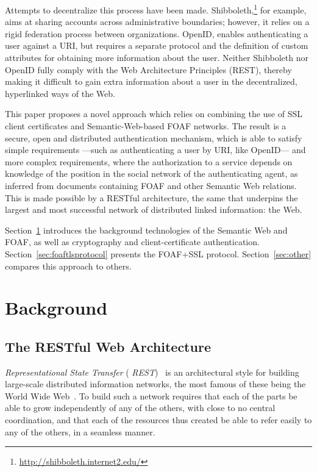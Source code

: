 \documentclass{llncs}
\begin{document}
Attempts to decentralize this process have been
made. Shibboleth,\footnote{\url{http://shibboleth.internet2.edu/}} for
example, aims at sharing accounts across administrative boundaries;
however, it relies on a rigid federation process between
organizations.  OpenID, enables authenticating a user against a URI,
but requires a separate protocol and the definition of custom
attributes for obtaining more information about the user.  Neither
Shibboleth nor OpenID fully comply with the Web Architecture
Principles (REST), thereby making it difficult to gain extra
information about a user in the decentralized, hyperlinked ways of the
Web.

This paper proposes a novel approach which relies on combining the use
of SSL client certificates and Semantic-Web-based FOAF networks. The
result is a secure, open and distributed authentication mechanism,
which is able to satisfy simple requirements ---such as authenticating
a user by URI, like OpenID--- and more complex requirements, where the
authorization to a service depends on knowledge of the position in the
social network of the authenticating agent, as inferred from documents
containing FOAF and other Semantic Web relations. This is made
possible by a RESTful architecture, the same that underpins the
largest and most successful network of distributed linked information:
the Web.

Section~\ref{sec:background} introduces the background technologies of
the Semantic Web and FOAF, as well as cryptography and
client-certificate authentication.  Section~\ref{sec:foaftlsprotocol}
presents the FOAF+SSL protocol.  Section~\ref{sec:other} compares this
approach to others.

\section{Background}
\label{sec:background}

\subsection{The RESTful Web Architecture}
\label{sec:rest}

{\em Representational State Transfer} ({\em
  REST})~\cite[Chap.~5]{fielding2000phd} is an architectural style for
building large-scale distributed information networks, the most famous
of these being the World Wide Web~\cite{WebArchVol1}.  To build such a
network requires that each of the parts be able to grow independently
of any of the others, with close to no central coordination, and that
each of the resources thus created be able to refer easily to any of
the others, in a seamless manner.
\end{document}

